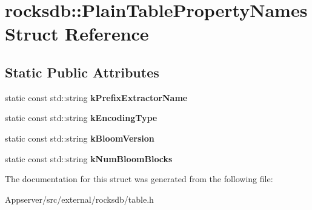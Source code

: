 \hypertarget{structrocksdb_1_1PlainTablePropertyNames}{}\section{rocksdb\+:\+:Plain\+Table\+Property\+Names Struct Reference}
\label{structrocksdb_1_1PlainTablePropertyNames}
\subsection*{Static Public Attributes}
\begin{DoxyCompactItemize}
\item 
static const std\+::string {\bfseries k\+Prefix\+Extractor\+Name}\hypertarget{structrocksdb_1_1PlainTablePropertyNames_acbb40c6ff38d62747e8cef4bda3f31dd}{}\label{structrocksdb_1_1PlainTablePropertyNames_acbb40c6ff38d62747e8cef4bda3f31dd}

\item 
static const std\+::string {\bfseries k\+Encoding\+Type}\hypertarget{structrocksdb_1_1PlainTablePropertyNames_a1e7c00d6bb3c3ef65693d34ecc49d56a}{}\label{structrocksdb_1_1PlainTablePropertyNames_a1e7c00d6bb3c3ef65693d34ecc49d56a}

\item 
static const std\+::string {\bfseries k\+Bloom\+Version}\hypertarget{structrocksdb_1_1PlainTablePropertyNames_a27959690a128c0b8351e586a4f8de091}{}\label{structrocksdb_1_1PlainTablePropertyNames_a27959690a128c0b8351e586a4f8de091}

\item 
static const std\+::string {\bfseries k\+Num\+Bloom\+Blocks}\hypertarget{structrocksdb_1_1PlainTablePropertyNames_a9165271d283adc7d2a695ad15fdebed9}{}\label{structrocksdb_1_1PlainTablePropertyNames_a9165271d283adc7d2a695ad15fdebed9}

\end{DoxyCompactItemize}


The documentation for this struct was generated from the following file\+:\begin{DoxyCompactItemize}
\item 
Appserver/src/external/rocksdb/table.\+h\end{DoxyCompactItemize}
